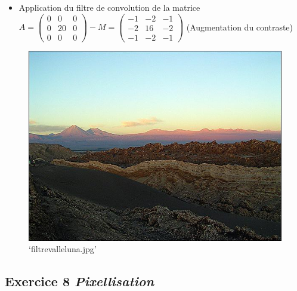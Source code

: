 \documentclass[11pt]{article}
\makeatletter
\def\maxwidth{\ifdim\Gin@nat@width>\linewidth\linewidth
    \else\Gin@nat@width\fi}
\let\Oldincludegraphics\includegraphics
\renewcommand{\includegraphics}[1]{\Oldincludegraphics[width=.8\maxwidth]{#1}}
\providecommand{\tightlist}{%
      \setlength{\itemsep}{0pt}\setlength{\parskip}{0pt}}
\makeatother
\begin{document}
\begin{itemize}
\tightlist
\item
  Application du filtre de convolution de la matrice
  \(A=\begin{pmatrix} 0&0&0\\0&20&0\\0&0&0 \end{pmatrix}-M=\begin{pmatrix} -1&-2&-1\\-2&16&-2\\-1&-2&-1 \end{pmatrix}\)
  (Augmentation du contraste)
\end{itemize}

\begin{figure}
\centering
\includegraphics{filtre_net_valleluna.jpg}
\caption{`filtrevalleluna.jpg'}
\end{figure}

    \hypertarget{exercice-8-pixellisation}{%
\subsection{\texorpdfstring{Exercice 8
\emph{Pixellisation}}{Exercice 8 Pixellisation}}\label{exercice-8-pixellisation}}
\end{document}
